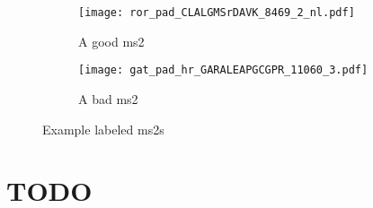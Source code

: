 \documentclass[12pt]{article}
\begin{document}
	\begin{figure}
		\centering
		\begin{subfigure}[b]{1\textwidth}
			\texttt{[image: ror\_pad\_CLALGMSrDAVK\_8469\_2\_nl.pdf]}
			\caption{A good ms2}
			\label{sfig:good_ms2}
		\end{subfigure}

		\begin{subfigure}[b]{1\textwidth}
			\texttt{[image: gat\_pad\_hr\_GARALEAPGCGPR\_11060\_3.pdf]}
			\caption{A bad ms2}
			\label{sfig:bad_ms2}
		\end{subfigure}

		\caption{Example labeled ms2s}
		\label{fig:ms2s}
	\end{figure}
	
	

	\section{TODO} %
	\label{sec:todo}
\end{document}

